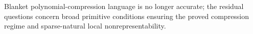 Blanket polynomial-compression language is no longer accurate; the residual questions concern broad primitive conditions ensuring the proved compression regime and sparse-natural local nonrepresentability.